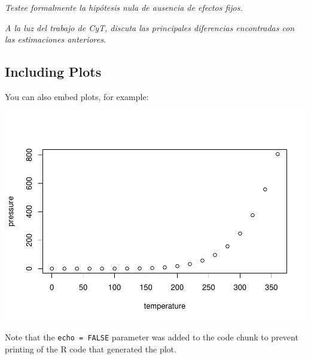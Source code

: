 \documentclass[
]{article}
\begin{document}
\emph{Testee formalmente la hipótesis nula de ausencia de efectos fijos.
}

\emph{A la luz del trabajo de CyT, discuta las principales diferencias
encontradas con las estimaciones anteriores.}

\hypertarget{including-plots}{%
\subsection{Including Plots}\label{including-plots}}

You can also embed plots, for example:

\includegraphics{TP2_Econometria_Avanzada_Casiano_Daboin_Quispe_files/figure-latex/pressure-1.pdf}

Note that the \texttt{echo\ =\ FALSE} parameter was added to the code
chunk to prevent printing of the R code that generated the plot.
\end{document}
